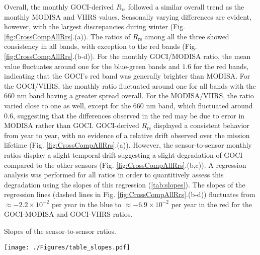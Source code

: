 \documentclass[]{interact}
\theoremstyle{plain}%
\theoremstyle{definition}
\theoremstyle{remark}
\begin{document}
Overall, the monthly GOCI-derived $R_\text{rs}$ followed a similar overall trend as the monthly MODISA and VIIRS values.  Seasonally varying differences are evident, however, with the largest discrepancies during winter (Fig. \ref{fig:CrossCompAllRrs}.(a)). The ratios of $R_\text{rs}$ among all the three showed consistency in all bands, with exception to the red bands (Fig. \ref{fig:CrossCompAllRrs}.(b-d)). For the monthly GOCI/MODISA ratio, the mean value fluctuates around one for the blue-green bands and $1.6$ for the red bands, indicating that the GOCI's red band was generally brighter than MODISA. For the GOCI/VIIRS, the monthly ratio fluctuated around one for all bands with the 660 nm band having a greater spread overall. For the MODISA/VIIRS, the ratio varied close to one as well, except for the 660 nm band, which fluctuated around 0.6, suggesting that the differences observed in the red may be due to error in MODISA rather than GOCI. GOCI-derived $R_\text{rs}$ displayed a consistent behavior from year to year, with no evidence of a relative drift observed over the mission lifetime (Fig. \ref{fig:CrossCompAllRrs}.(a)). However, the sensor-to-sensor monthly ratios display a slight temporal drift suggesting a slight degradation of GOCI compared to the other sensors (Fig. \ref{fig:CrossCompAllRrs}.(b,c)). A regression analysis was performed for all ratios in order to quantitively assess this degradation using the slopes of this regression (\autoref{tab:slopes}). The slopes of the regression lines (dashed lines in Fig. \ref{fig:CrossCompAllRrs}.(b-d)) fluctuates from $\approx-2.2\times10^{-2}$ per year in the blue to $\approx-6.9\times10^{-2}$ per year in the red for the GOCI-MODISA and GOCI-VIIRS ratios.
\begin{table}[htbp!]
\caption{Slopes of the sensor-to-sensor ratios. \label{tab:slopes}}

  \centering
    \texttt{[image: ./Figures/table\_slopes.pdf]}

\end{table}
\end{document}
